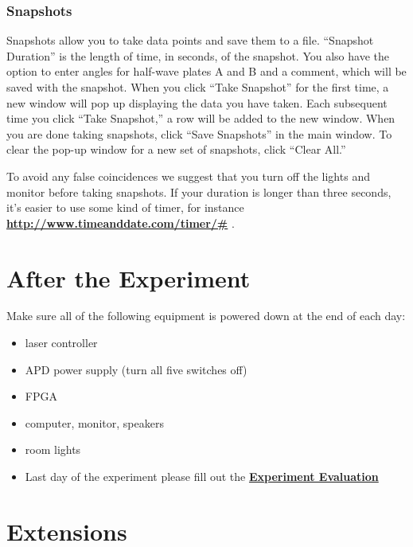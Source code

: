 \documentclass{../lab}
\begin{document}
\subsubsection{Snapshots}

Snapshots allow you to take data points and save them to a file. ``Snapshot Duration'' is the length of time, in seconds, of the snapshot. You also have the option to enter angles for half-wave plates A and B and a comment, which will be saved with the snapshot. When you click ``Take Snapshot'' for the first time, a new window will pop up displaying the data you have taken. Each subsequent time you click ``Take Snapshot,'' a row will be added to the new window. When you are done taking snapshots, click ``Save Snapshots'' in the main window. To clear the pop-up window for a new set of snapshots, click ``Clear All.''

To avoid any false coincidences we suggest that you turn off the lights and monitor before taking snapshots. If your duration is longer than three seconds, it's easier to use some kind of timer, for instance \href{http://www.timeanddate.com/timer/#}{\textbf{http://www.timeanddate.com/timer/\#}} .


\section{After the Experiment}

Make sure all of the following equipment is powered down at the end of each day:

\begin{itemize}
    \item laser controller

    \item APD power supply (turn all five switches off)

    \item FPGA

    \item computer, monitor, speakers

    \item room lights

    \item Last day of the experiment please fill out the \href{\ExperimentEvaluation}{\textbf{Experiment Evaluation}}

\end{itemize}

\section{Extensions}
\end{document}
